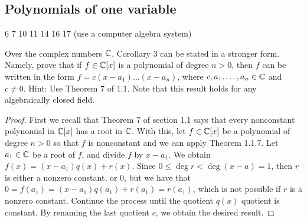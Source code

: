 \subsection{Polynomials of one variable}

6
7
10
11
14
16
17 (use a computer algebra system)

\begin{exercise}{1}
Over the complex numbers $\mathbb{C}$, Corollary 3 can be stated in a stronger form. Namely, prove that if $f\in\mathbb{C}[x]$ is a polynomial of degree $n>0$, then $f$ can be written in the form $f=c(x-a_1)\dots(x-a_n)$, where $c,a_1,\dots,a_n\in\mathbb{C}$ and $c\neq 0$. Hint: Use Theorem 7 of 1.1. Note that this result holds for any algebraically closed field.
\end{exercise}
\begin{proof}
First we recall that Theorem 7 of section 1.1 says that every nonconstant polynomial in $\mathbb{C}[x]$ has a root in $\mathbb{C}$. With this, let $f\in\mathbb{C}[x]$ be a polynomial of degree $n>0$ so that $f$ is nonconstant and we can apply Theorem 1.1.7. Let $a_1\in\mathbb{C}$ be a root of $f$, and divide $f$ by $x-a_1$. We obtain $f(x)=(x-a_1)q(x)+r(x)$. Since $0\leq\deg r<\deg (x-a)=1$, then $r$ is either a nonzero constant, or 0, but we have that $0 =f(a_1) =(x-a_1)q(a_1)+r(a_1) =r(a_1)$, which is not possible if $r$ is a nonzero constant. Continue the process until the quotient $q(x)$ quotient is constant. By renaming the last quotient $c$, we obtain the desired result.
\end{proof}

